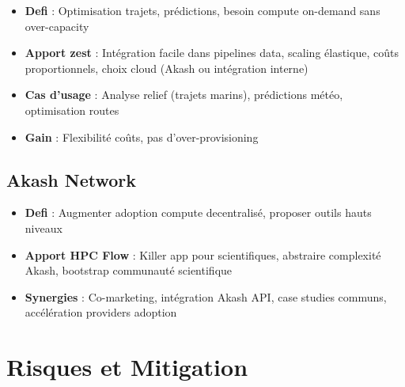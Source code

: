 \documentclass[11pt,a4paper]{article}
\begin{document}
	\begin{itemize}
		\item \textbf{Defi} : Optimisation trajets, prédictions, besoin compute on-demand sans over-capacity
		\item \textbf{Apport zest} : Intégration facile dans pipelines data, scaling élastique, coûts proportionnels, choix cloud (Akash ou intégration interne)
		\item \textbf{Cas d'usage} : Analyse relief (trajets marins), prédictions météo, optimisation routes
		\item \textbf{Gain} : Flexibilité coûts, pas d'over-provisioning
	\end{itemize}
	
	\subsection{Akash Network}
	
	\begin{itemize}
		\item \textbf{Defi} : Augmenter adoption compute decentralisé, proposer outils hauts niveaux
		\item \textbf{Apport HPC Flow} : Killer app pour scientifiques, abstraire complexité Akash, bootstrap communauté scientifique
		\item \textbf{Synergies} : Co-marketing, intégration Akash API, case studies communs, accélération providers adoption
	\end{itemize}
	
	\newpage
	
	\section{Risques et Mitigation}
	
\end{document}
